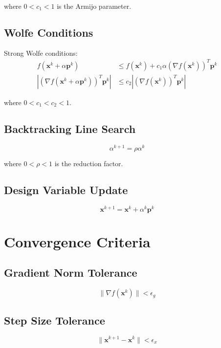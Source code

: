 \documentclass{article}
\begin{document}
where $0 < c_1 < 1$ is the Armijo parameter.

\subsection{Wolfe Conditions}
Strong Wolfe conditions:
\begin{align}
f(\mathbf{x}^k + \alpha \mathbf{p}^k) &\leq f(\mathbf{x}^k) + c_1 \alpha (\nabla f(\mathbf{x}^k))^T \mathbf{p}^k \\
|(\nabla f(\mathbf{x}^k + \alpha \mathbf{p}^k))^T \mathbf{p}^k| &\leq c_2 |(\nabla f(\mathbf{x}^k))^T \mathbf{p}^k|
\end{align}

where $0 < c_1 < c_2 < 1$.

\subsection{Backtracking Line Search}
\begin{equation}
\alpha^{k+1} = \rho \alpha^k
\end{equation}

where $0 < \rho < 1$ is the reduction factor.

\subsection{Design Variable Update}
\begin{equation}
\mathbf{x}^{k+1} = \mathbf{x}^k + \alpha^k \mathbf{p}^k
\end{equation}

\section{Convergence Criteria}

\subsection{Gradient Norm Tolerance}
\begin{equation}
\|\nabla f(\mathbf{x}^k)\| < \epsilon_g
\end{equation}

\subsection{Step Size Tolerance}
\begin{equation}
\|\mathbf{x}^{k+1} - \mathbf{x}^k\| < \epsilon_x
\end{equation}
\end{document}
